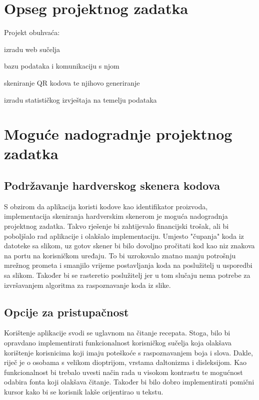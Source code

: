	\section{Opseg projektnog zadatka}
	Projekt obuhvaća:
	\begin{packed_item}
 		\item izradu web sučelja
		\item bazu podataka i komunikaciju s njom
		\item skeniranje QR kodova te njihovo generiranje
		\item izradu statističkog izvještaja na temelju podataka
	\end{packed_item}

	\section{Moguće nadogradnje projektnog zadatka}
		\subsection{Podržavanje hardverskog skenera kodova}
			S obzirom da aplikacija koristi kodove kao identifikator proizvoda, implementacija skeniranja hardverskim skenerom je moguća nadogradnja projektnog zadatka. Takvo rješenje bi zahtijevalo financijski trošak, ali bi poboljšalo rad aplikacije i olakšalo implementaciju. Umjesto "čupanja" koda iz datoteke sa slikom, uz gotov skener bi bilo dovoljno pročitati kod kao niz znakova na portu na korisničkom uređaju. To bi uzrokovalo znatno manju potrošnju mrežnog prometa i smanjilo vrijeme postavljanja koda na poslužitelj u usporedbi sa slikom. Također bi se rasteretio poslužitelj jer u tom slučaju nema potrebe za izvršavanjem algoritma za raspoznavanje koda iz slike.
	
		\subsection{Opcije za pristupačnost}
 			Korištenje aplikacije svodi se uglavnom na čitanje recepata. Stoga, bilo bi opravdano implementirati funkcionalnost korisničkog sučelja koja olakšava korištenje korisnicima koji imaju poteškoće s raspoznavanjem boja i slova. Dakle, riječ je o osobama s velikom dioptrijom, vrstama daltonizma i disleksijom. Kao funkcionalnost bi trebalo uvesti način rada u visokom kontrastu te mogućnost odabira fonta koji olakšava čitanje. Također bi bilo dobro implementirati pomični kursor kako bi se korisnik lakše orijentirao u tekstu. 

